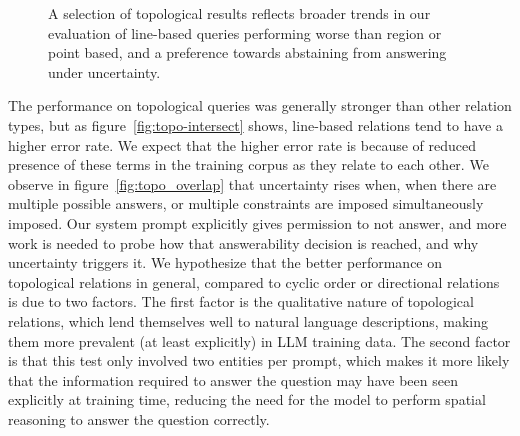 \begin{figure}[h]
    \centering
    \hfill
    \hfill
    \caption{A selection of topological results reflects broader trends in our evaluation of line-based queries performing worse than region or point based, and a preference towards abstaining from answering under uncertainty.}
    \label{fig:topo_plots}
\end{figure}

The performance on topological queries was generally stronger than other relation types, but as figure~\ref{fig:topo-intersect} shows, line-based relations tend to have a higher error rate. 
We expect that the higher error rate is because of reduced presence of these terms in the training corpus as they relate to each other. 
We observe in figure~\ref{fig:topo_overlap} that uncertainty rises when, when there are multiple possible answers, or multiple constraints are imposed simultaneously imposed.
Our system prompt explicitly gives permission to not answer, and more work is needed to probe how that answerability decision is reached, and why uncertainty triggers it. 
We hypothesize that the better performance on topological relations in general, compared to cyclic order or directional relations is due to two factors.
The first factor is the qualitative nature of topological relations, which lend themselves well to natural language descriptions, making them more prevalent (at least explicitly) in LLM training data.
The second factor is that this test only involved two entities per prompt, which makes it more likely that the information required to answer the question may have been seen explicitly at training time, reducing the need for the model to perform spatial reasoning to answer the question correctly.




